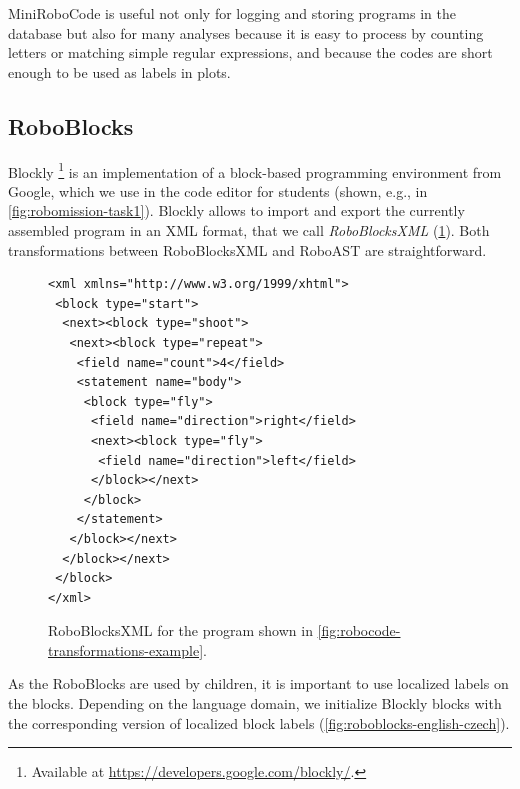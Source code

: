 MiniRoboCode is useful not only for logging and storing programs in the database
but also for many analyses because it is easy to process by counting
letters or matching simple regular expressions, and because the codes are short
enough to be used as labels in plots.


\subsection{RoboBlocks}

Blockly%
\footnote{Available at \url{https://developers.google.com/blockly/}.}
is an implementation of a block-based programming
environment from Google,
which we use in the code editor for students
(shown, e.g., in \cref{fig:robomission-task1}).
Blockly allows to import and export the currently assembled program in
an XML format, that we call \emph{RoboBlocksXML}
(\cref{fig:roboblocks-xml}).
Both transformations between RoboBlocksXML and RoboAST are straightforward.


\begin{figure}[h]
\begin{lstlisting}[basicstyle=\small\ttfamily]
<xml xmlns="http://www.w3.org/1999/xhtml">
 <block type="start">
  <next><block type="shoot">
   <next><block type="repeat">
    <field name="count">4</field>
    <statement name="body">
     <block type="fly">
      <field name="direction">right</field>
      <next><block type="fly">
       <field name="direction">left</field>
      </block></next>
     </block>
    </statement>
   </block></next>
  </block></next>
 </block>
</xml>
\end{lstlisting}
  \caption{%
    RoboBlocksXML for the program shown in %
    \cref{fig:robocode-transformations-example}.}
\label{fig:roboblocks-xml}
\end{figure}

As the RoboBlocks are used by children, it is important to use localized labels
on the blocks.
Depending on the language domain, we initialize Blockly blocks with the corresponding
version of localized block labels
(\cref{fig:roboblocks-english-czech}).

